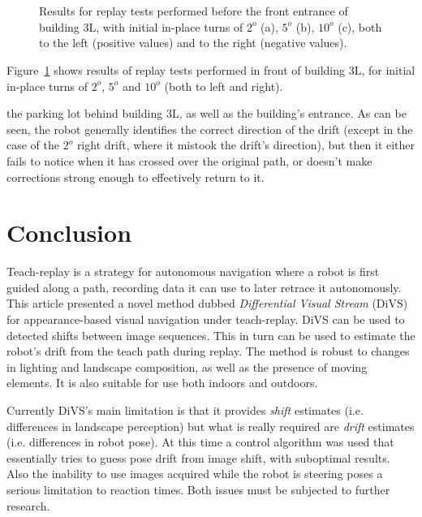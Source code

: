 \documentclass[twocolumn, 9pt,fleqn]{jsproceedings}
\begin{document}
\begin{figure}[h!]
\centering
{}\\
\\
\caption{Results for replay tests performed before the front entrance of building 3L, with initial in-place turns of $2^o$ (a),  $5^o$ (b), $10^o$ (c), both to the left (positive values) and to the right (negative values). }
\label{fig:replay_tests}
\end{figure}

Figure~\ref{fig:replay_tests} shows results of replay tests performed in front of building 3L, for initial in-place turns of $2^o$, $5^o$ and $10^o$ (both to left and right).

the parking lot behind building 3L, as well as the building's entrance. As can be seen, the robot generally identifies the correct direction of the drift (except in the case of the $2^o$ right drift, where it mistook the drift's direction), but then it either fails to notice when it has crossed over the original path, or doesn't make corrections strong enough to effectively return to it.

\section{Conclusion}

Teach-replay is a strategy for autonomous navigation where a robot is first guided along a path, recording data it can use to later retrace it autonomously. This article presented a novel method dubbed \textit{Differential Visual Stream} (DiVS) for appearance-based visual navigation under teach-replay. DiVS can be used to detected shifts between image sequences. This in turn can be used to estimate the robot's drift from the teach path during replay. The method is robust to changes in lighting and landscape composition, as well as the presence of moving elements. It is also suitable for use both indoors and outdoors.

Currently DiVS's main limitation is that it provides \textit{shift} estimates (i.e. differences in landscape perception) but what is really required are \textit{drift} estimates (i.e. differences in robot pose). At this time a control algorithm was used that essentially tries to guess pose drift from image shift, with suboptimal results. Also the inability to use images acquired while the robot is steering poses a serious limitation to reaction times. Both issues must be subjected to further research.

\footnotesize




\normalsize
\end{document}
